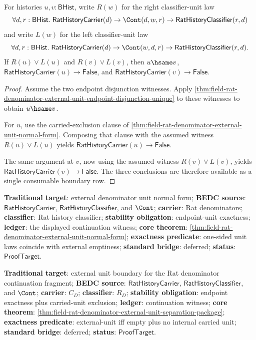 \begin{theorem}
\label{thm:field-rat-denominator-external-unit-unique-separated-normal-form}
For histories $u,v:\mathsf{BHist}$, write $R(w)$ for the right
classifier-unit law
$$
\forall d,r:\mathsf{BHist}.\;
\mathsf{RatHistoryCarrier}(d)\to
\Cont(d,w,r)\to
\mathsf{RatHistoryClassifier}(r,d)
$$
and write $L(w)$ for the left classifier-unit law
$$
\forall d,r:\mathsf{BHist}.\;
\mathsf{RatHistoryCarrier}(d)\to
\Cont(w,d,r)\to
\mathsf{RatHistoryClassifier}(r,d).
$$
If $R(u)\lor L(u)$ and $R(v)\lor L(v)$, then $u\hsame v$,
$\mathsf{RatHistoryCarrier}(u)\to\mathsf{False}$, and
$\mathsf{RatHistoryCarrier}(v)\to\mathsf{False}$.
\end{theorem}
\begin{proof}
Assume the two endpoint disjunction witnesses. Apply
\autoref{thm:field-rat-denominator-external-unit-endpoint-disjunction-unique}
to these witnesses to obtain $u\hsame v$.

For $u$, use the carried-exclusion clause of
\autoref{thm:field-rat-denominator-external-unit-normal-form}. Composing that
clause with the assumed witness $R(u)\lor L(u)$ yields
$\mathsf{RatHistoryCarrier}(u)\to\mathsf{False}$.

The same argument at $v$, now using the assumed witness $R(v)\lor L(v)$, yields
$\mathsf{RatHistoryCarrier}(v)\to\mathsf{False}$. The three conclusions are
therefore available as a single consumable boundary row.
\end{proof}

\textbf{Traditional target}: external denominator unit normal form;
\textbf{BEDC source}: $\mathsf{RatHistoryCarrier}$,
$\mathsf{RatHistoryClassifier}$, and $\Cont$; \textbf{carrier}: Rat
denominators; \textbf{classifier}: Rat history classifier;
\textbf{stability obligation}: endpoint-unit exactness; \textbf{ledger}: the
displayed continuation witness; \textbf{core theorem}:
\autoref{thm:field-rat-denominator-external-unit-normal-form};
\textbf{exactness predicate}: one-sided unit laws coincide with external
emptiness; \textbf{standard bridge}: deferred; \textbf{status}:
$\mathsf{ProofTarget}$.

\textbf{Traditional target}: external unit boundary for the Rat denominator
continuation fragment; \textbf{BEDC source}: $\mathsf{RatHistoryCarrier}$,
$\mathsf{RatHistoryClassifier}$, and $\Cont$; \textbf{carrier}:
$C_D$; \textbf{classifier}: $R_D$; \textbf{stability obligation}: endpoint
exactness plus carried-unit exclusion; \textbf{ledger}: continuation witness;
\textbf{core theorem}:
\autoref{thm:field-rat-denominator-external-unit-separation-package};
\textbf{exactness predicate}: external-unit iff empty plus no internal carried
unit; \textbf{standard bridge}: deferred; \textbf{status}:
$\mathsf{ProofTarget}$.

